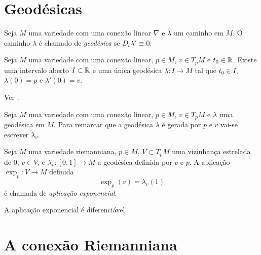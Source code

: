 \section{Geodésicas}

\begin{definicao}
	Seja $M$ uma variedade com uma conexão linear $\nabla$ e
	$\lambda$ um caminho em $M$.
	O caminho $\lambda$ é chamado de \emph{geodésica} se $D_t \lambda' \equiv 0$.
\end{definicao}

\begin{teorema}
	Seja $M$ uma variedade com uma conexão linear,
	$p \in M$,
	$v \in T_p M$ e
	$t_0 \in \mathbb R$.
	Existe uma intervalo aberto $I \subset \mathbb R$ e uma única geodésica $\lambda: I \rightarrow M$ tal que $t_0 \in I$,
	$\lambda(0) = p$ e
	$\lambda'(0) = v$.
\end{teorema}

\begin{demonstracao}
	Ver \cite[Theorem 4.10]{Lee1997}.
\end{demonstracao}

\begin{observacao}
	Seja $M$ uma variedade com uma conexão linear,
	$p \in M$,
	$v \in T_p M$ e
	$\lambda$ uma geodésica em $M$.
	Para remarcar que a geodésica $\lambda$ é gerada por $p$ e $v$ vai-se escrever $\lambda_v$.
\end{observacao}

\begin{definicao}
	Seja $M$ uma variedade riemanniana,
	$p \in M$,
	$V \subset T_p M$ uma vizinhança estrelada de 0,
	$v \in V$, e
	$\lambda_v: [0,1] \rightarrow M$ a geodésica definida por $v$ e $p$.
	A aplicação $\exp_p: V \rightarrow M$ definida
	\begin{equation*}
	\exp_p(v) = \lambda_v(1)
	\end{equation*}
	é chamada de \emph{aplicação exponencial}.
\end{definicao}

\begin{observacao}
	A aplicação exponencial é diferenciável.
\end{observacao}


\section{A conexão Riemanniana}

